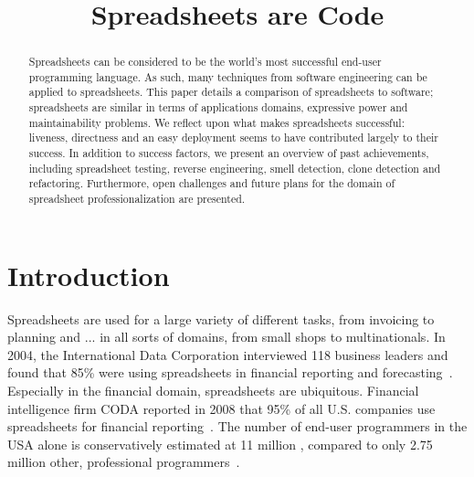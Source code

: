 \documentclass[conference]{IEEEtran}
\begin{document}
\title{Spreadsheets are Code}

\author{
}


\maketitle

\begin{abstract}
Spreadsheets can be considered to be the world's most successful end-user programming language. As such, many techniques from software engineering can be applied to spreadsheets. This paper details a comparison of spreadsheets to software; spreadsheets are similar in terms of applications domains, expressive power and maintainability problems. We reflect upon what makes spreadsheets successful: liveness, directness  and an easy deployment  seems to have contributed largely to their success. In addition to success factors, we present an overview of past achievements, including spreadsheet testing, reverse engineering, smell detection, clone detection and refactoring. Furthermore, open challenges and future plans for the domain of spreadsheet professionalization are presented.
\end{abstract}

\IEEEpeerreviewmaketitle

\section{Introduction}
Spreadsheets are used for a large variety of different tasks, from invoicing to planning and ...  in all sorts of domains, from small shops to multinationals. In 2004, the International Data Corporation interviewed 118 business leaders and found that 85\% were using spreadsheets in financial reporting and forecasting~\cite{Panko2008}. Especially in the financial domain, spreadsheets are ubiquitous. Financial intelligence firm CODA reported in 2008 that 95\% of all U.S. companies use spreadsheets for financial reporting~\cite{Panko2008}. The number of end-user programmers in the USA alone is conservatively estimated at 11 million , compared to only 2.75 million other, professional programmers~\cite{Scaf2005}. 
\end{document}
